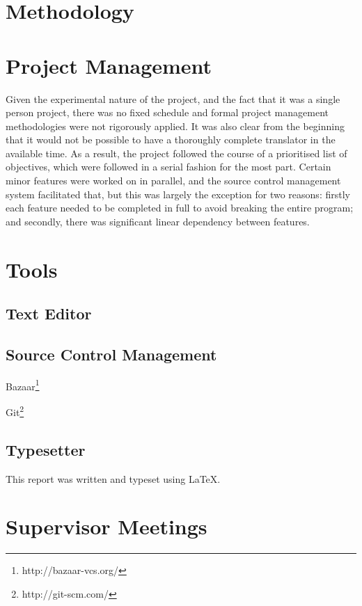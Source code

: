 \section{Methodology}


\section{Project Management}

Given the experimental nature of the project, and the fact that it was a single
person project, there was no fixed schedule and formal project management
methodologies were not rigorously applied. It was also clear from the beginning
that it would not be possible to have a thoroughly complete translator in the
available time. As a result, the project followed the course of a prioritised
list of objectives, which were followed in a serial fashion for the most part.
Certain minor features were worked on in parallel, and the source control
management system facilitated that, but this was largely the exception for two
reasons: firstly each feature needed to be completed in full to avoid breaking
the entire program; and secondly, there was significant linear dependency
between features.


\section{Tools}

\subsection{Text Editor}

\subsection{Source Control Management}

Bazaar\footnote{http://bazaar-vcs.org/}

Git\footnote{http://git-scm.com/}

\subsection{Typesetter}

This report was written and typeset using \LaTeX.


\section{Supervisor Meetings}

